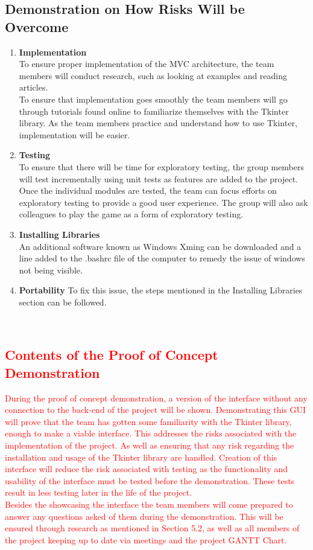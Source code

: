 \documentclass{article}
\begin{document}
\subsection{Demonstration on How Risks Will be Overcome}
\begin{enumerate}
    \item \textbf{Implementation}\\
    To ensure proper implementation of the MVC architecture, the team members will conduct research, such as looking at examples and reading articles. \\  
    To ensure that implementation goes smoothly the team members will go through tutorials found online to familiarize themselves with the Tkinter library. As the team members practice and understand how to use Tkinter, implementation will be easier.  
    \item \textbf{Testing}\\
    To ensure that there will be time for exploratory testing, the group members will test incrementally using unit tests as features are added to the project. Once the individual modules are tested, the team can focus efforts on exploratory testing to provide a good user experience. The group will also ask colleagues to play the game as a form of exploratory testing. \\
    \item \textbf{Installing Libraries}\\
     An additional software known as Windows Xming can be downloaded and a line added to the .bashrc file of the computer to remedy the issue of windows not being visible.  \\
    \item \textbf{Portability}
    To fix this issue, the steps mentioned in the Installing Libraries section can be followed.
\end{enumerate}\\
\textcolor{red}{\subsection{\textcolor{red}{Contents of the Proof of Concept Demonstration}}}
\textcolor{red}{During the proof of concept demonstration, a version of the interface without any connection to the back-end of the project will be shown. Demonstrating this GUI will prove that the team has gotten some familiarity with the Tkinter library, enough to make a viable interface. This addresses the risks associated with the implementation of the project. As well as ensuring that any risk regarding the installation and usage of the Tkinter library are handled. Creation of this interface will reduce the risk associated with testing  as the functionality and usability of the interface must be tested before the demonstration. These tests result in less testing later in the life of the project.\\
Besides the showcasing the interface the team members will come prepared to answer any questions asked of them during the demonstration. This will be ensured through research as mentioned in Section 5.2, as well as all members of the project keeping up to date via meetings and the project GANTT Chart.}\\
\end{document}
